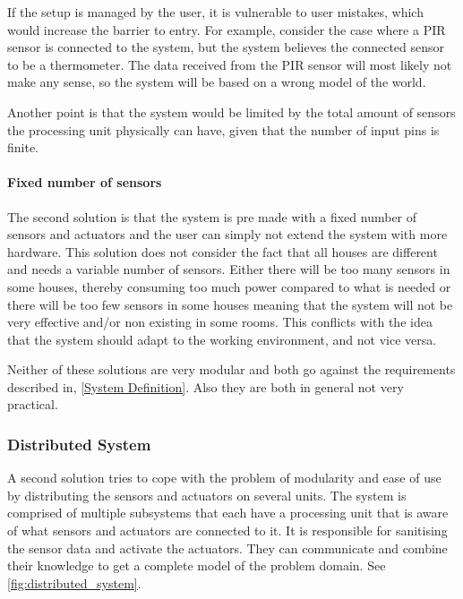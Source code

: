 If the setup is managed by the user, it is vulnerable to user mistakes, which would increase the barrier to entry. For example, consider the case where a PIR sensor is connected to the system, but the system believes the connected sensor to be a thermometer. The data received from the PIR sensor will most likely not make any sense, so the system will be based on a wrong model of the world.

Another point is that the system would be limited by the total amount of sensors the processing unit physically can have, given that the number of input pins is finite.

\paragraph{Fixed number of sensors}
The second solution is that the system is pre made with a fixed number of sensors and actuators and the user can simply not extend the system with more hardware. This solution does not consider the fact that all houses are different and needs a variable number of sensors. Either there will be too many sensors in some houses, thereby consuming too much power compared to what is needed or there will be too few sensors in some houses meaning that the system will not be very effective and/or non existing in some rooms. This conflicts with the idea that the system should adapt to the working environment, and not vice versa.

Neither of these solutions are very modular and both go against the requirements described in, \cref{System Definition}. Also they are both in general not very practical.

\subsubsection{Distributed System}
A second solution tries to cope with the problem of modularity and ease of use by distributing the sensors and actuators on several units. The system is comprised of multiple subsystems that each have a processing unit that is aware of what sensors and actuators are connected to it. It is responsible for sanitising the sensor data and activate the actuators. They can communicate and combine their knowledge to get a complete model of the problem domain. See \cref{fig:distributed_system}.

